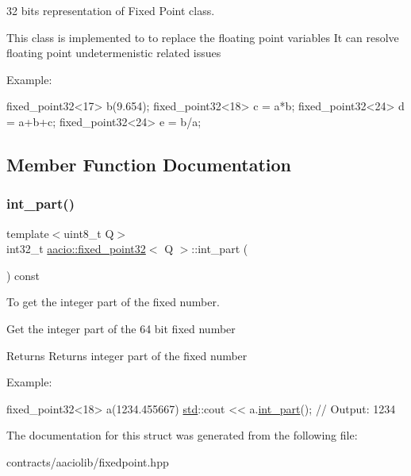 32 bits representation of Fixed Point class. 

This class is implemented to to replace the floating point variables It can resolve floating point undetermenistic related issues

Example\+: 
\begin{DoxyCode}
fixed\_point32<17> b(9.654);
fixed\_point32<18> c = a*b;
fixed\_point32<24> d = a+b+c;
fixed\_point32<24> e = b/a;
\end{DoxyCode}
 

\subsection{Member Function Documentation}
\mbox{\label{structaacio_1_1fixed__point32_ae19b9b7a0358872ec7ff7492c77a1694}} 
\subsubsection{\texorpdfstring{int\+\_\+part()}{int\_part()}}
{\footnotesize\ttfamily template$<$uint8\+\_\+t Q$>$ \\
int32\+\_\+t \mbox{\hyperlink{structaacio_1_1fixed__point32}{aacio\+::fixed\+\_\+point32}}$<$ Q $>$\+::int\+\_\+part (\begin{DoxyParamCaption}{ }\end{DoxyParamCaption}) const\hspace{0.3cm}{\ttfamily [inline]}}



To get the integer part of the fixed number. 

Get the integer part of the 64 bit fixed number \begin{DoxyReturn}{Returns}
Returns integer part of the fixed number
\end{DoxyReturn}
Example\+: 
\begin{DoxyCode}
fixed\_point32<18> a(1234.455667)
\mbox{\hyperlink{namespacestd}{std}}::cout << a.\mbox{\hyperlink{structaacio_1_1fixed__point32_ae19b9b7a0358872ec7ff7492c77a1694}{int\_part}}(); \textcolor{comment}{// Output: 1234}
\end{DoxyCode}
 

The documentation for this struct was generated from the following file\+:\begin{DoxyCompactItemize}
\item 
contracts/aaciolib/fixedpoint.\+hpp\end{DoxyCompactItemize}
